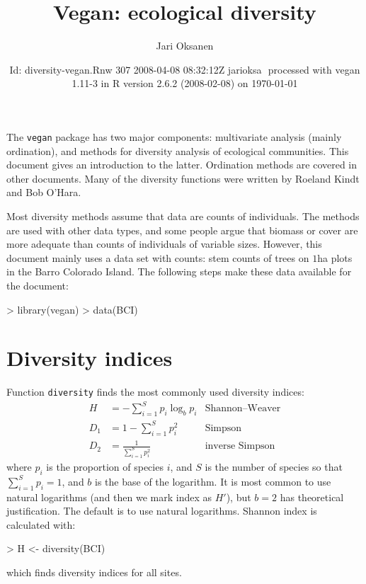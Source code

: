 \documentclass[a4paper,10pt]{amsart}
\title{Vegan: ecological diversity}
\author{Jari Oksanen}
\date{$ $Id: diversity-vegan.Rnw 307 2008-04-08 08:32:12Z jarioksa $ $
  processed with vegan 1.11-3
  in R version 2.6.2 (2008-02-08) on \today}
\begin{document}


\maketitle

\tableofcontents

\noindent The \texttt{vegan} package has two major components:
multivariate analysis (mainly ordination), and methods for diversity
analysis of ecological communities.  This document gives an
introduction to the latter.  Ordination methods are covered in other
documents.  Many of the diversity functions were written by Roeland
Kindt and Bob O'Hara.

Most diversity methods assume that data are counts of individuals.
The methods are used with other data types, and some people argue that
biomass or cover are more adequate than counts of individuals of
variable sizes.  However, this document mainly uses a data set with
counts: stem counts of trees on $1$ha plots in the Barro Colorado
Island.  The following steps make these data available for the
document:
\begin{Schunk}
\begin{Sinput}
> library(vegan)
> data(BCI)
\end{Sinput}
\end{Schunk}

\section{Diversity indices}

Function \texttt{diversity} finds the most commonly used diversity
indices:
\begin{align}
H &= - \sum_{i=1}^S p_i \log_b  p_i & \text{Shannon--Weaver}\\
D_1 &= 1 - \sum_{i=1}^S p_i^2  &\text{Simpson}\\
D_2 &= \frac{1}{\sum_{i=1}^S p_i^2}  &\text{inverse Simpson}
\end{align}
where $p_i$ is the proportion of species $i$, and $S$ is the number of
species so that $\sum_{i=1}^S p_i = 1$, and $b$ is the base of the
logarithm.  It is most common to use natural logarithms (and then we
mark index as $H'$), but $b=2$ has
theoretical justification. The default is to use natural logarithms.
Shannon index is calculated with:
\begin{Schunk}
\begin{Sinput}
> H <- diversity(BCI)
\end{Sinput}
\end{Schunk}
which finds diversity indices for all sites.
\end{document}
